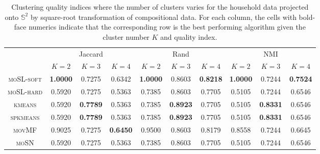 \documentclass[10pt]{article}
\newcommand{\bbS}{\mathbb{S}}
\begin{document}
\begin{table}[]
	\caption{Clustering quality indices where the number of clusters varies for the \textsf{household} data projected onto $\bbS^2$ by square-root transformation of compositional data. For each column, the cells with bold-face numerics indicate that the corresponding row is 
		the best performing algorithm given the cluster number $K$ and quality index.}
	\label{table:household}
	\vskip-0.3cm
	\smallskip
	\centering\small
	\begin{tabular}{cccccccccc}
		\hline
		\multirow{2}{*}{} & \multicolumn{3}{c}{Jaccard} & \multicolumn{3}{c}{Rand} & \multicolumn{3}{c}{NMI} \\ \cline{2-10} 
		& $K=2$     & $K=3$    & $K=4$    & $K=2$      & $K=3$     & $K=4$     & $K=2$   & $K=3$   & $K=4$    \\ \hline
		\textsc{moSL-soft} & \textbf{1.0000} & 0.7275 & 0.6342 & \textbf{1.0000} & 0.8603 & \textbf{0.8218} & \textbf{1.0000} & 0.7244 & \textbf{0.7524} \\ 
		\textsc{moSL-hard} & 0.5920 & 0.7275 & 0.5363 & 0.7385 & 0.8603 & 0.7705 & 0.5105 & 0.7244 & 0.6546 \\ 
		\textsc{kmeans} & 0.5920 & \textbf{0.7789} & 0.5363 & 0.7385 & \textbf{0.8923} & 0.7705 & 0.5105 & \textbf{0.8331} & 0.6546 \\ 
		\textsc{spkmeans} & 0.5920 & \textbf{0.7789} & 0.5363 & 0.7385 & \textbf{0.8923} & 0.7705 & 0.5105 & \textbf{0.8331} & 0.6546 \\ 
		\textsc{movMF} & 0.9025 & 0.7275 & \textbf{0.6450} & 0.9500 & 0.8603 & 0.8179 & 0.8558 & 0.7244 & 0.6645 \\ 
		\textsc{moSN} & 0.5920 & 0.7275 & 0.5363 & 0.7385 & 0.8603 & 0.7705 & 0.5105 & 0.7244 & 0.6546 \\  \hline
	\end{tabular}
\end{table}
\end{document}
